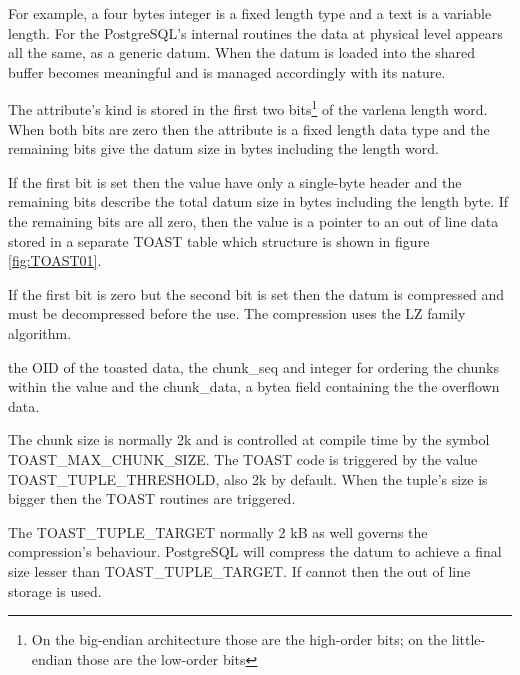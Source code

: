For example, a four bytes integer is a fixed length type and a text is a variable length. For the 
PostgreSQL's internal routines the data at physical level appears all the same, as a generic datum. 
When the datum is loaded into the shared buffer becomes meaningful and is managed 
accordingly with its nature.\newline

The attribute's kind is stored in the first two bits\footnote{On the big-endian architecture those 
are the high-order bits; on the little-endian those are the low-order bits} of the 
varlena length word. When both bits are zero then the attribute is a fixed length 
data type and the remaining bits give the datum size in bytes including the length word.\newline

If the first bit is set then the value have only a single-byte header and the remaining bits 
describe the total datum size in bytes including the length byte. If the remaining bits are all 
zero, then the value is a pointer to an out of line data stored in a separate TOAST table which 
structure is shown in figure \ref{fig:TOAST01}.\newline

If the first bit is zero but the second bit is set then the datum is compressed and must be 
decompressed before the use. The compression uses the LZ family algorithm.\newline

the OID of the toasted data, the chunk\_seq and integer for ordering the chunks 
within the value and the chunk\_data, a bytea field containing the the 
overflown data.\newline 

The chunk size is normally 2k and is controlled at compile time by the symbol 
TOAST\_MAX\_CHUNK\_SIZE. The TOAST code is triggered by the value TOAST\_TUPLE\_THRESHOLD, also 2k 
by default. When the tuple's size is bigger then the TOAST routines are triggered.\newline

The TOAST\_TUPLE\_TARGET normally 2 kB as well governs the compression's behaviour. PostgreSQL will 
compress the datum to achieve a final size lesser than TOAST\_TUPLE\_TARGET. If cannot then the out 
of line storage is used.

